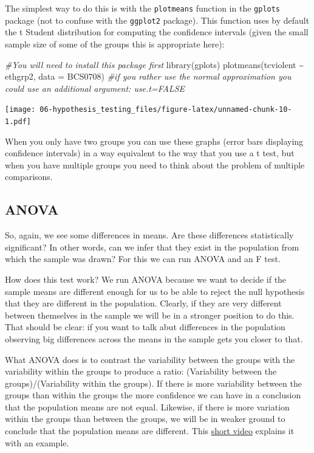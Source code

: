 \documentclass[
]{book}
\newenvironment{Shaded}{\begin{snugshade}}{\end{snugshade}}
\newcommand{\AttributeTok}[1]{\textcolor[rgb]{0.77,0.63,0.00}{#1}}
\newcommand{\CommentTok}[1]{\textcolor[rgb]{0.56,0.35,0.01}{\textit{#1}}}
\newcommand{\FunctionTok}[1]{\textcolor[rgb]{0.00,0.00,0.00}{#1}}
\newcommand{\NormalTok}[1]{#1}
\newcommand{\SpecialCharTok}[1]{\textcolor[rgb]{0.00,0.00,0.00}{#1}}
\begin{document}
The simplest way to do this is with the \texttt{plotmeans} function in the \texttt{gplots} package (not to confuse with the \texttt{ggplot2} package). This function uses by default the t Student distribution for computing the confidence intervals (given the small sample size of some of the groups this is appropriate here):

\begin{Shaded}
\begin{Highlighting}[]
\CommentTok{\#You will need to install this package first}
\FunctionTok{library}\NormalTok{(gplots)}
\FunctionTok{plotmeans}\NormalTok{(tcviolent }\SpecialCharTok{\textasciitilde{}}\NormalTok{ ethgrp2, }\AttributeTok{data =}\NormalTok{ BCS0708) }\CommentTok{\#if you rather use the normal approximation you could use an additional argument: use.t=FALSE}
\end{Highlighting}
\end{Shaded}

\texttt{[image: 06-hypothesis\_testing\_files/figure-latex/unnamed-chunk-10-1.pdf]}

When you only have two groups you can use these graphs (error bars displaying confidence intervals) in a way equivalent to the way that you use a t test, but when you have multiple groups you need to think about the problem of multiple comparisons.

\hypertarget{anova}{%
\subsection{ANOVA}\label{anova}}

So, again, we see some differences in means. Are these differences statistically significant? In other words, can we infer that they exist in the population from which the sample was drawn? For this we can run ANOVA and an F test.

How does this test work? We run ANOVA because we want to decide if the sample means are different enough for us to be able to reject the null hypothesis that they are different in the population. Clearly, if they are very different between themselves in the sample we will be in a stronger position to do this. That should be clear: if you want to talk abut differences in the population observing big differences across the means in the sample gets you closer to that.

What ANOVA does is to contrast the variability between the groups with the variability within the groups to produce a ratio: (Variability between the groups)/(Variability within the groups). If there is more variability between the groups than within the groups the more confidence we can have in a conclusion that the population means are not equal. Likewise, if there is more variation within the groups than between the groups, we will be in weaker ground to conclude that the population means are different. This \href{https://www.youtube.com/watch?v=ITf4vHhyGpc}{short video} explains it with an example.
\end{document}
